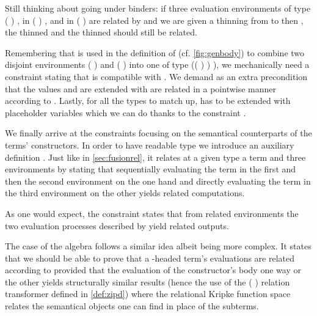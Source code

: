 
Still thinking about going under binders: if three evaluation environments  of
type {( )  },  in {( )  },
and  in {( )  } are related by  and we are
given a thinning  from  to  then , the thinned  and the
thinned  should still be related.


Remembering that \AF{\_>>\_} is used in the definition of  (cf. \cref{fig:genbody})
to combine two disjoint environments {( )  } and
{( )  } into one of type
{(( \AF{++} ) )  )}, we mechanically need a
constraint stating that \AF{\_>>\_} is compatible with . We demand
as an extra precondition that the values  and  are extended
with are related in a pointwise manner according to . Lastly, for all
the types to match up,  has to be extended with placeholder variables
which we can do thanks to the  constraint .


We finally arrive at the constraints focusing on the semantical counterparts
of the terms' constructors. In order to have readable type we introduce an
auxiliary definition . Just like in \cref{sec:fusionrel}, it relates at
a given type a term and three environments by stating that sequentially evaluating
the term in the first and then the second environment on the one hand and directly
evaluating the term in the third environment on the other yields related computations.


As one would expect, the  constraint states that from related environments
the two evaluation processes described by  yield related outputs.


The case of the algebra follows a similar idea albeit being more complex. It states
that we should be able to prove that a -headed term's evaluations are related
according to  provided that the evaluation of the constructor's body one way or
the other yields structurally similar results (hence the use of the ({ })
relation transformer defined in \cref{def:zipd}) where the relational Kripke function
space relates the semantical objects one can find in place of the subterms.

